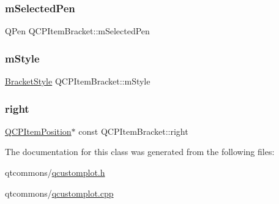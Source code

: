 \mbox{\label{class_q_c_p_item_bracket_adcfb53602d1802d00e2de4fd6df6b291}} 
\subsubsection{\texorpdfstring{mSelectedPen}{mSelectedPen}}
{\footnotesize\ttfamily Q\+Pen Q\+C\+P\+Item\+Bracket\+::m\+Selected\+Pen\hspace{0.3cm}{\ttfamily [protected]}}

\mbox{\label{class_q_c_p_item_bracket_ac911907184c824d621f274f8e0990080}} 
\subsubsection{\texorpdfstring{mStyle}{mStyle}}
{\footnotesize\ttfamily \mbox{\hyperlink{class_q_c_p_item_bracket_a7ac3afd0b24a607054e7212047d59dbd}{Bracket\+Style}} Q\+C\+P\+Item\+Bracket\+::m\+Style\hspace{0.3cm}{\ttfamily [protected]}}

\mbox{\label{class_q_c_p_item_bracket_afa6c1360b05a50c4e0df37b3cebab6be}} 
\subsubsection{\texorpdfstring{right}{right}}
{\footnotesize\ttfamily \mbox{\hyperlink{class_q_c_p_item_position}{Q\+C\+P\+Item\+Position}}$\ast$ const Q\+C\+P\+Item\+Bracket\+::right}



The documentation for this class was generated from the following files\+:\begin{DoxyCompactItemize}
\item 
qtcommons/\mbox{\hyperlink{qcustomplot_8h}{qcustomplot.\+h}}\item 
qtcommons/\mbox{\hyperlink{qcustomplot_8cpp}{qcustomplot.\+cpp}}\end{DoxyCompactItemize}
